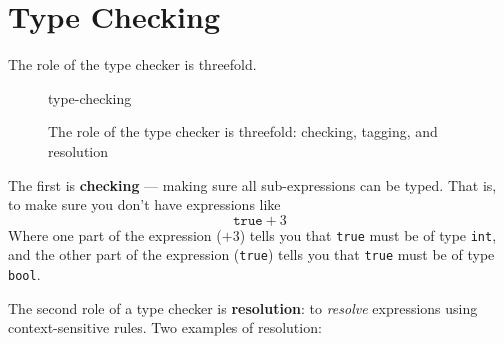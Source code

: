 {%



\section{Type Checking}\label{section:type-checking-goals}
The role of the type checker is threefold. 

\begin{figure}[H]
    \centering
    {type-checking}
    \caption{The role of the type checker is threefold: checking, tagging, and resolution}
    \label{fig:type-inference}
\end{figure}

The first is \textbf{checking} --- making sure all sub-expressions can be typed. That is, to make sure you don't have expressions like
\[\texttt{true}+3\]
Where one part of the expression ($+3$) tells you that \texttt{true} must be of type \texttt{int}, and the other part of the expression (\texttt{true}) tells you that \texttt{true} must be of type \texttt{bool}.

The second role of a type checker is \textbf{resolution}: to \textit{resolve} expressions using context-sensitive rules. Two examples of resolution:

}

